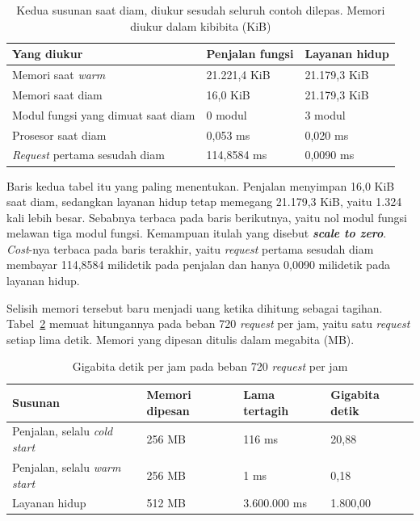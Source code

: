 \begin{table}[htbp]
  \centering
  \caption{Kedua susunan saat diam, diukur sesudah seluruh contoh dilepas.
    Memori diukur dalam kibibita (KiB)}
  \label{tab:diam-serverless}
  \begin{tabularx}{\textwidth}{|X|l|l|}
    \hline
    \textbf{Yang diukur} & \textbf{Penjalan fungsi} & \textbf{Layanan hidup} \\
    \hline
    Memori saat \textit{warm} & 21.221,4 KiB & 21.179,3 KiB \\
    \hline
    Memori saat diam & 16,0 KiB & 21.179,3 KiB \\
    \hline
    Modul fungsi yang dimuat saat diam & 0 modul & 3 modul \\
    \hline
    Prosesor saat diam & 0,053 ms & 0,020 ms \\
    \hline
    \textit{Request} pertama sesudah diam & 114,8584 ms & 0,0090 ms \\
    \hline
  \end{tabularx}
\end{table}

Baris kedua tabel itu yang paling menentukan. Penjalan menyimpan 16,0 KiB saat
diam, sedangkan layanan hidup tetap memegang 21.179,3 KiB, yaitu 1.324 kali
lebih besar. Sebabnya terbaca pada baris berikutnya, yaitu nol modul fungsi
melawan tiga modul fungsi. Kemampuan itulah yang disebut \textbf{\textit{scale to
zero}}. \textit{Cost}-nya terbaca pada baris terakhir, yaitu \textit{request} pertama
sesudah diam membayar 114,8584 milidetik pada penjalan dan hanya 0,0090
milidetik pada layanan hidup.

Selisih memori tersebut baru menjadi uang ketika dihitung sebagai tagihan.
Tabel~\ref{tab:gigabita-detik} memuat hitungannya pada beban 720 \textit{request} per
jam, yaitu satu \textit{request} setiap lima detik. Memori yang dipesan ditulis
dalam megabita (MB).

\begin{table}[htbp]
  \centering
  \caption{Gigabita detik per jam pada beban 720 \textit{request} per jam}
  \label{tab:gigabita-detik}
  \begin{tabularx}{\textwidth}{|l|l|l|X|}
    \hline
    \textbf{Susunan} & \textbf{Memori dipesan} & \textbf{Lama tertagih} & \textbf{Gigabita detik} \\
    \hline
    Penjalan, selalu \textit{cold start} & 256 MB & 116 ms & 20,88 \\
    \hline
    Penjalan, selalu \textit{warm start} & 256 MB & 1 ms & 0,18 \\
    \hline
    Layanan hidup & 512 MB & 3.600.000 ms & 1.800,00 \\
    \hline
  \end{tabularx}
\end{table}


